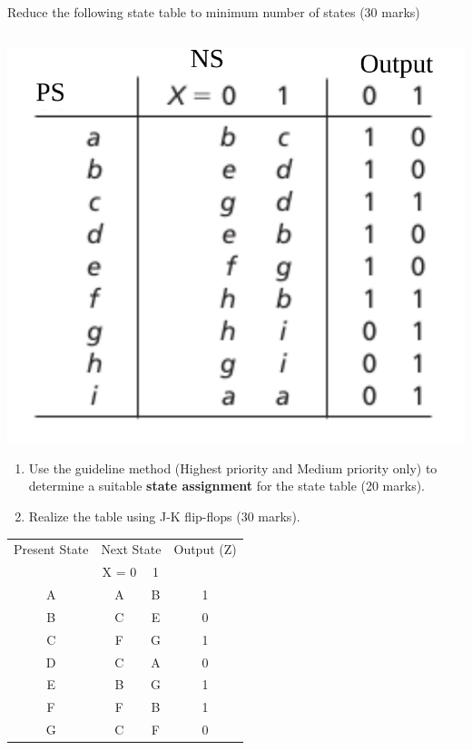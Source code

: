 \begin{prob}
  Reduce the following state table to minimum number of states (30 marks)\\
  \begin{tabular}{c|cc|cc}
  \end{tabular}
  \includegraphics[width=0.3\linewidth]{./media/15.15-state-table.png}
  \label{p:state-reduction}
\end{prob}
\newpage

\begin{prob}
  \begin{enumerate}
  \item
    Use the guideline method (Highest priority and Medium priority only) to determine a suitable \textbf{state assignment} for the state table (20 marks).
  \item Realize the table using J-K flip-flops (30 marks).
  \end{enumerate} 

  \begin{tabular}{c|cc|c}
    \toprule
    Present State & \multicolumn{2}{c|}{Next State} & Output (Z)\\
                  & X = 0 & 1 & \\
                  \midrule
    A & A & B & 1\\
    B & C & E & 0\\
    C & F & G & 1\\
    D & C & A & 0\\
    E & B & G & 1\\
    F & F & B & 1\\
    G & C & F & 0\\
    \bottomrule
  \end{tabular}
\end{prob}
\newpage

